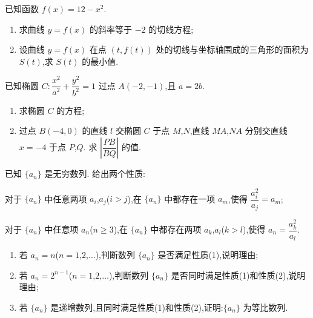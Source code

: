 \begin{problem}
已知函数 \(f(x)=12-x^2\).

\begin{enumerate}
    \item 求曲线 \(y=f(x)\) 的斜率等于 \(-2\) 的切线方程;
    \item 设曲线 \(y=f(x)\) 在点 \((t,f(t))\) 处的切线与坐标轴围成的三角形的面积为 \(S(t)\),求 \(S(t)\) 的最小值.
\end{enumerate}
\end{problem}

\begin{problem}
已知椭圆 \(C:\dfrac{x^2}{a^2}+\dfrac{y^2}{b^2}=1\) 过点 \(A(-2,-1)\),且 \(a=2b\).

\begin{enumerate}
    \item 求椭圆 \(C\) 的方程;
    \item 过点 \(B(-4,0)\) 的直线 \(l\) 交椭圆 \(C\) 于点 \(M\),\(N\),直线 \(MA\),\(NA\) 分别交直线 \(x=-4\) 于点 \(P\),\(Q\). 求 \(\left|\dfrac{PB}{BQ}\right|\) 的值.
\end{enumerate}
\end{problem}

\begin{problem}
已知 \(\{a_n\}\) 是无穷数列. 给出两个性质:

\begin{circlelist}
\item 对于 \(\{a_n\}\) 中任意两项 \(a_i\),\(a_j\)(\(i>j\)),在 \(\{a_n\}\) 中都存在一项 \(a_m\),使得 \(\dfrac{a_i^2}{a_j}=a_m\);

\item 对于 \(\{a_n\}\) 中任意项 \(a_n\)(\(n\ge3\)),在 \(\{a_n\}\) 中都存在两项 \(a_k\),\(a_l\)(\(k>l\)),使得 \(a_n=\dfrac{a_k^2}{a_l}\).
\end{circlelist}

\begin{enumerate}
\item 若 \(a_n=n\)(\(n=1\),\(2\),\(\dots\)),判断数列 \(\{a_n\}\) 是否满足性质(1),说明理由;
\item 若 \(a_n=2^{n-1}\)(\(n=1\),\(2\),\(\dots\)),判断数列 \(\{a_n\}\) 是否同时满足性质(1)和性质(2),说明理由;
\item 若 \(\{a_n\}\) 是递增数列,且同时满足性质(1)和性质(2),证明:\(\{a_n\}\) 为等比数列.
\end{enumerate}
\end{problem}

